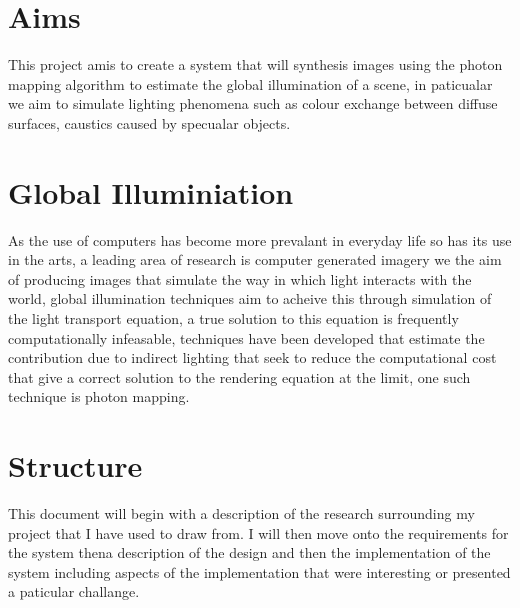 \section{Aims}
This project amis to create a system that will synthesis images using the photon mapping algorithm to estimate the
global illumination of a scene, in paticualar we aim to simulate lighting phenomena such as colour exchange between
diffuse surfaces, caustics caused by specualar objects.

\section{Global Illuminiation}
As the use of computers has become more prevalant in everyday life so has its use in the arts, a leading area of research is
computer generated imagery we the aim of producing images that simulate the way in which light interacts
with the world, global illumination techniques aim to acheive this through simulation of the light transport equation, a true
solution to this equation is frequently computationally infeasable, techniques have been developed that estimate the contribution
due to indirect lighting that seek to reduce the computational cost that give a correct solution to the rendering equation at
the limit, one such technique is photon mapping.

\section{Structure}
This document will begin with a description of the research surrounding my project that I have used to draw from. I will then
move onto the requirements for the system thena description of the design and then the implementation of the system including
aspects of the implementation that were interesting or presented a paticular challange.
